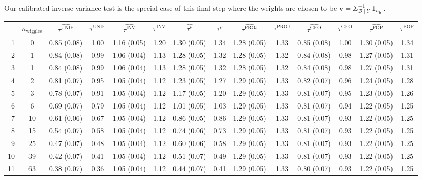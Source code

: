 \documentclass[letter]{article}
\DeclareMathOperator{\ones}{\mathbf{1}}
\newcommand{\vvec}{\mathbold{v}}
\newcommand{\boundary}{\mathcal{B}}
\newcommand{\sentinels}{\bm{b}}
\newcommand{\unifavg}{\tau^{\mathrm{UNIF}}}
\newcommand{\invvar}{\tau^{\mathrm{INV}}}
\newcommand{\taurho}{\tau^{\rho}}
\newcommand{\tauproj}{\tau^{\mathrm{PROJ}}}
\newcommand{\taugeo}{\tau^{\mathrm{GEO}}}
\newcommand{\taupop}{\tau^{\mathrm{POP}}}
\begin{document}
Our calibrated inverse-variance test is the special case of this final step where the weights are chosen to be \(\vvec = \Sigma^{-1}_{\boundary \mid Y} \ones_{n_{\sentinels}}\).
    

\begin{landscape}

\begin{table}
\begin{tabular}{r|ccccccccccccc}
	& $n_{\mathrm{wiggles}}$ & $\widehat{\unifavg}$ & $\unifavg$ & $\widehat{\invvar}$ & $\invvar$ & $\widehat{\taurho}$ & $\taurho$ & $\widehat{\tauproj}$ & $\tauproj$ & $\widehat{\taugeo}$ & $\taugeo$ & $\widehat{\taupop}$ & $\taupop$\\
		\hline
		1 & 0 & 0.85 (0.08) & 1.00 & 1.16 (0.05) & 1.20 & 1.30 (0.05) & 1.34 & 1.28 (0.05) & 1.33 & 0.85 (0.08) & 1.00 & 1.30 (0.05) & 1.34 \\
		2 & 1 & 0.84 (0.08) & 0.99 & 1.06 (0.04) & 1.13 & 1.28 (0.05) & 1.32 & 1.28 (0.05) & 1.32 & 0.84 (0.08) & 0.98 & 1.27 (0.05) & 1.31 \\
		3 & 1 & 0.84 (0.08) & 0.99 & 1.06 (0.04) & 1.13 & 1.28 (0.05) & 1.32 & 1.28 (0.05) & 1.32 & 0.84 (0.08) & 0.98 & 1.27 (0.05) & 1.31 \\
		4 & 2 & 0.81 (0.07) & 0.95 & 1.05 (0.04) & 1.12 & 1.23 (0.05) & 1.27 & 1.29 (0.05) & 1.33 & 0.82 (0.07) & 0.96 & 1.24 (0.05) & 1.28 \\
		5 & 3 & 0.78 (0.07) & 0.91 & 1.05 (0.04) & 1.12 & 1.17 (0.05) & 1.20 & 1.29 (0.05) & 1.33 & 0.81 (0.07) & 0.95 & 1.23 (0.05) & 1.26 \\
		6 & 6 & 0.69 (0.07) & 0.79 & 1.05 (0.04) & 1.12 & 1.01 (0.05) & 1.03 & 1.29 (0.05) & 1.33 & 0.81 (0.07) & 0.94 & 1.22 (0.05) & 1.25 \\
		7 & 10 & 0.61 (0.06) & 0.67 & 1.05 (0.04) & 1.12 & 0.86 (0.05) & 0.86 & 1.29 (0.05) & 1.33 & 0.81 (0.07) & 0.93 & 1.22 (0.05) & 1.25 \\
		8 & 15 & 0.54 (0.07) & 0.58 & 1.05 (0.04) & 1.12 & 0.74 (0.06) & 0.73 & 1.29 (0.05) & 1.33 & 0.81 (0.07) & 0.93 & 1.22 (0.05) & 1.25 \\
		9 & 25 & 0.47 (0.07) & 0.48 & 1.05 (0.04) & 1.12 & 0.60 (0.06) & 0.58 & 1.29 (0.05) & 1.33 & 0.81 (0.07) & 0.93 & 1.22 (0.05) & 1.25 \\
		10 & 39 & 0.42 (0.07) & 0.41 & 1.05 (0.04) & 1.12 & 0.51 (0.07) & 0.49 & 1.29 (0.05) & 1.33 & 0.81 (0.07) & 0.93 & 1.22 (0.05) & 1.25 \\
		11 & 63 & 0.38 (0.07) & 0.36 & 1.05 (0.04) & 1.12 & 0.44 (0.07) & 0.41 & 1.29 (0.05) & 1.33 & 0.80 (0.07) & 0.93 & 1.22 (0.05) & 1.25 \\

\end{tabular}
\end{table}
\end{landscape}
\end{document}
